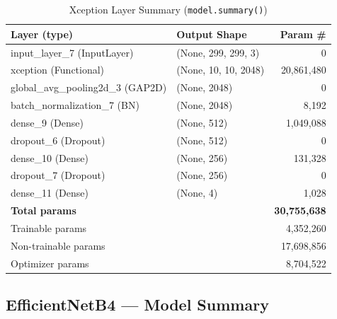 \documentclass[12pt,a4paper]{article}
\begin{document}
\begin{table}[H]
\centering
\caption{Xception Layer Summary (\texttt{model.summary()})}
\label{tab:summary_xception}
\begin{tabular}{l l r}
  \toprule
  \textbf{Layer (type)} & \textbf{Output Shape} & \textbf{Param \#} \\
  \midrule
  input\_layer\_7 (InputLayer)         & (None, 299, 299, 3)   &            0 \\
  xception (Functional)                & (None, 10, 10, 2048)  &   20,861,480 \\
  global\_avg\_pooling2d\_3 (GAP2D)    & (None, 2048)          &            0 \\
  batch\_normalization\_7 (BN)         & (None, 2048)          &        8,192 \\
  dense\_9 (Dense)                     & (None, 512)           &    1,049,088 \\
  dropout\_6 (Dropout)                 & (None, 512)           &            0 \\
  dense\_10 (Dense)                    & (None, 256)           &      131,328 \\
  dropout\_7 (Dropout)                 & (None, 256)           &            0 \\
  dense\_11 (Dense)                    & (None, 4)             &        1,028 \\
  \midrule
  \multicolumn{2}{l}{\textbf{Total params}}    & \textbf{30,755,638} \\
  \multicolumn{2}{l}{Trainable params}         &       4,352,260 \\
  \multicolumn{2}{l}{Non-trainable params}     &      17,698,856 \\
  \multicolumn{2}{l}{Optimizer params}         &       8,704,522 \\
  \bottomrule
\end{tabular}
\end{table}

\subsection{EfficientNetB4 --- Model Summary}
\end{document}

